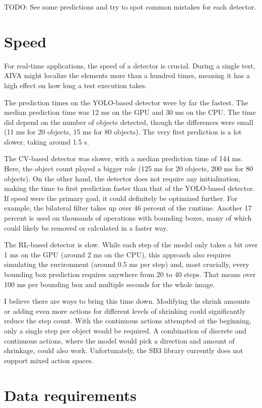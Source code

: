 \documentclass[
  digital,     %
  oneside,     %
  nosansbold,  %
  nocolorbold, %
  lof,         %
  lot,         %
]{fithesis4}
\begin{document}
TODO: See some predictions and try to spot common mistakes for each detector.

\section{Speed}

For real-time applications, the speed of a detector is crucial. During a single test, AIVA might localize the elements more than a hundred times, meaning it has a high effect on how long a test execution takes.

The prediction times on the YOLO-based detector were by far the fastest. The median prediction time was 12 ms on the GPU and 30 ms on the CPU. The time did depend on the number of objects detected, though the differences were small (11 ms for 20 objects, 15 ms for 80 objects). The very first prediction is a lot slower, taking around 1.5 s.

The CV-based detector was slower, with a median prediction time of 144 ms. Here, the object count played a bigger role (125 ms for 20 objects, 200 ms for 80 objects). On the other hand, the detector does not require any initialization, making the time to first prediction faster than that of the YOLO-based detector. If speed were the primary goal, it could definitely be optimized further. For example, the bilateral filter takes up over 46 percent of the runtime. Another 17 percent is used on thousands of operations with bounding boxes, many of which could likely be removed or calculated in a faster way.

The RL-based detector is slow. While each step of the model only takes a bit over 1 ms on the GPU (around 2 ms on the CPU), this approach also requires simulating the environment (around 0.5 ms per step) and, most crucially, every bounding box prediction requires anywhere from 20 to 40 steps. That means over 100 ms per bounding box and multiple seconds for the whole image.

I believe there are ways to bring this time down. Modifying the shrink amounts or adding even more actions for different levels of shrinking could significantly reduce the step count. With the continuous actions attempted at the beginning, only a single step per object would be required. A combination of discrete and continuous actions, where the model would pick a direction and amount of shrinkage, could also work. Unfortunately, the SB3 library currently does not support mixed action spaces.

\section{Data requirements}
\end{document}
